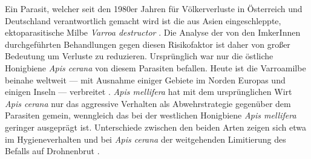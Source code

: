Ein Parasit, welcher seit den 1980er Jahren für Völkerverluste in Österreich und Deutschland verantwortlich gemacht wird ist die aus Asien eingeschleppte, ektoparasitische Milbe \textit{Varroa destructor} \citep{rosenkranz2010, genersch2010, morawetz2019}. Die Analyse der von den ImkerInnen durchgeführten Behandlungen gegen diesen Risikofaktor ist daher von großer Bedeutung um Verluste zu reduzieren. Ursprünglich war nur die östliche Honigbiene \textit{Apis cerana} von diesem Parasiten befallen. Heute ist die Varroamilbe beinahe weltweit --- mit Ausnahme einiger Gebiete im Norden Europas und einigen Inseln --- verbreitet \citep{dahle2010,brodschneider2011}. \textit{Apis mellifera} hat mit dem ursprünglichen Wirt \textit{Apis cerana} nur das aggressive Verhalten als Abwehrstrategie gegenüber dem Parasiten gemein, wenngleich das bei der westlichen Honigbiene \textit{Apis mellifera} geringer ausgeprägt ist. Unterschiede zwischen den beiden Arten zeigen sich etwa im Hygieneverhalten und bei \textit{Apis cerana} der weitgehenden Limitierung des Befalls auf Drohnenbrut \citep{rosenkranz2010}.
\newline
